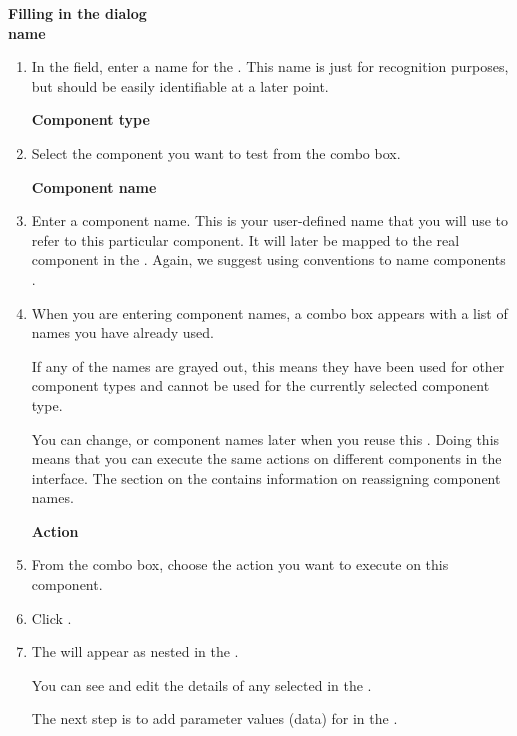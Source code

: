 \textbf{Filling in the \gdstep{} dialog}\\
\textbf{\gdstep{} name}
\begin{enumerate}
\item In the  field, enter a name for the \gdstep{}. This name is just for recognition 
purposes, but should be easily identifiable at a later point. 

\textbf{Component type}
\item Select the component you want to test from the combo box. 


\textbf{Component name}
\label{componentnameteststep}
\item Enter a component name. This is your user-defined name that you will use to refer to this particular component. It will later be mapped to the real component in the \gdaut{}. Again, we suggest using conventions to name components . 

\item When you are entering component names, a combo box appears with a list of names you have already used. 

If any of the names are grayed out, this means they have been used for other component types and cannot be used for the currently selected component type. 

You can change, or  component names later when you reuse this \gdcase{}. Doing this means that you can execute the same actions on different components in the interface. The section on the \gdcompnamesview{}  contains information on reassigning component names. 

\textbf{Action}

\item From the combo box, choose the action you want to execute on this component. 

\item Click . 
\item The \gdstep{} will appear as nested in the \gdcase{}.  

You can see and edit the details of any selected \gdstep{} in the \gdpropview{}.

The next step is to add parameter values (data) for \gdsteps{} in the \gdpropview{} . 
\end{enumerate}

 
